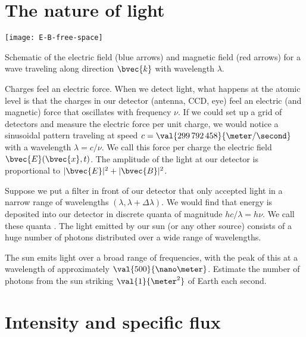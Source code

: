 \section{The nature of light}\label{s.nature-light}

\begin{marginfigure}
\texttt{[image: E-B-free-space]}
\caption[The electric force in a light wave]{Schematic of the electric field (blue arrows) and magnetic field (red arrows) for a wave traveling along direction $\bvec{k}$ with wavelength $\lambda$.}
\label{f.light-wave}
\end{marginfigure}
Charges feel an electric force.
When we detect light, what happens at the atomic level is that the charges in our detector (antenna, CCD, eye) feel an electric (and magnetic) force that oscillates with frequency $\nu$. If we could set up a grid of detectors and measure the electric force per unit charge, we would notice a sinusoidal pattern traveling at speed $c = \val{299\,792\,458}{\meter/\second}$ with a wavelength $\lambda = c/\nu$.  We call this force per charge the electric field $\bvec{E}(\bvec{x},t)$. The amplitude of the light at our detector is proportional to $|\bvec{E}|^{2} + |\bvec{B}|^{2}$.

Suppose we put a filter in front of our detector that only accepted light in a narrow range of wavelengths $(\lambda,\lambda+\Delta\lambda)$. We would find that energy is deposited into our detector in discrete quanta of magnitude $hc/\lambda = h\nu$. We call these quanta . The light emitted by our sun (or any other source) consists of a huge number of photons distributed over a wide range of wavelengths.

\begin{exercisebox}
The sun emits light over a broad range of frequencies, with the peak of this  at a wavelength of approximately $\val{500}{\nano\meter}$. Estimate the number of photons from the sun striking $\val{1}{\meter^{2}}$ of Earth each second.
\end{exercisebox}

\section{Intensity and specific flux}
\label{s.intensity-specific-flux}


